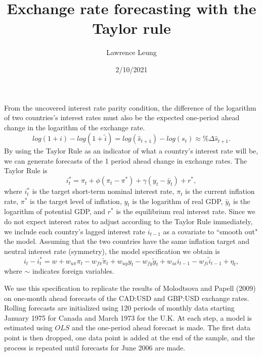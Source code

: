 \documentclass{article}
\title{Exchange rate forecasting with the Taylor rule}
\author{Lawrence Leung}
\date{2/10/2021}
\begin{document}
\maketitle

From the uncovered interest rate parity condition, the difference of the logarithm of two countries's interest rates must also be the expected one-period ahead change in the logarithm of the exchange rate. 
\begin{equation}
log(1+i)-log(1+\tilde{i}) = log(\hat{s}_{t+1}) - log(s_t) \approx \%\Delta \hat{s}_{t+1}.
\end{equation}
By using the Taylor Rule as an indicator of what a country's interest rate will be, we can generate forecasts of the 1 period ahead change in exchange rates. The Taylor Rule is
\begin{equation}
i_t^* = \pi_t + \phi(\pi_t-\pi^*) + \gamma(y_t-\bar{y}_t) + r^*,
\end{equation}
where $i_t^*$ is the target short-term nominal interest rate, $\pi_t$ is the current inflation rate, $\pi^*$ is the target level of inflation, $y_t$ is the logarithm of real GDP, $\bar{y}_t$ is the logarithm of potential GDP, and $r^*$ is the equilibrium real interest rate. Since we do not expect interest rates to adjust according to the Taylor Rule immediately, we include each country's lagged interest rate $i_{t-1}$ as a covariate to ``smooth out" the model. Assuming that the two countries have the same inflation target and neutral interest rate (symmetry), the model specification we obtain is
\begin{equation}
i_t-i_t^*=w+w_{u\pi}\pi_t-w_{f\pi}\tilde{\pi}_t+w_{uy}y_t-w_{fy}\tilde{y}_t+w_{ui}i_{t-1}-w_{fi}\tilde{i}_{t-1}+\eta_t,
\end{equation}
where $\sim$ indicates foreign variables. 


We use this specification to replicate the results of Molodtsova and Papell (2009) on one-month ahead forecasts of the CAD:USD and GBP:USD exchange rates. Rolling forecasts are initialized using 120 periods of monthly data starting January 1975 for Canada and March 1973 for the U.K. At each step, a model is estimated using $OLS$ and the one-period ahead forecast is made. The first data point is then dropped, one data point is added at the end of the sample, and the process is repeated until forecasts for June 2006 are made.
\end{document}
